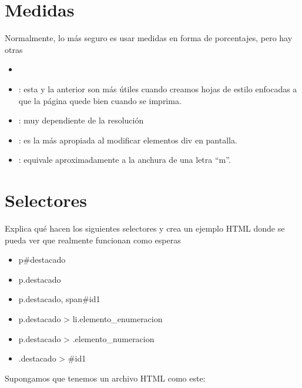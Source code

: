 \documentclass[letterpaper,10pt,spanish]{sphinxmanual}
\begin{document}
\section{Medidas}
\label{tema3:medidas}
Normalmente, lo más seguro es usar medidas en forma de porcentajes, pero hay otras
\begin{itemize}
\item {} 

\item {} 
: esta y la anterior son más útiles cuando creamos hojas de estilo enfocadas a que la página quede bien cuando se imprima.

\item {} 
: muy dependiente de la resolución

\item {} 
: es la más apropiada al modificar elementos div en pantalla.

\item {} 
: equivale aproximadamente a la anchura de una letra ``m''.

\end{itemize}


\section{Selectores}
\label{tema3:selectores}
Explica qué hacen los siguientes selectores y crea un ejemplo HTML donde se pueda ver que realmente funcionan como esperas
\begin{itemize}
\item {} 
p\#destacado

\item {} 
p.destacado

\item {} 
p.destacado, span\#id1

\item {} 
p.destacado \textgreater{} li.elemento\_enumeracion

\item {} 
p.destacado \textgreater{} .elemento\_numeracion

\item {} 
.destacado \textgreater{} \#id1

\end{itemize}

Supongamos que tenemos un archivo HTML como este:
\end{document}
